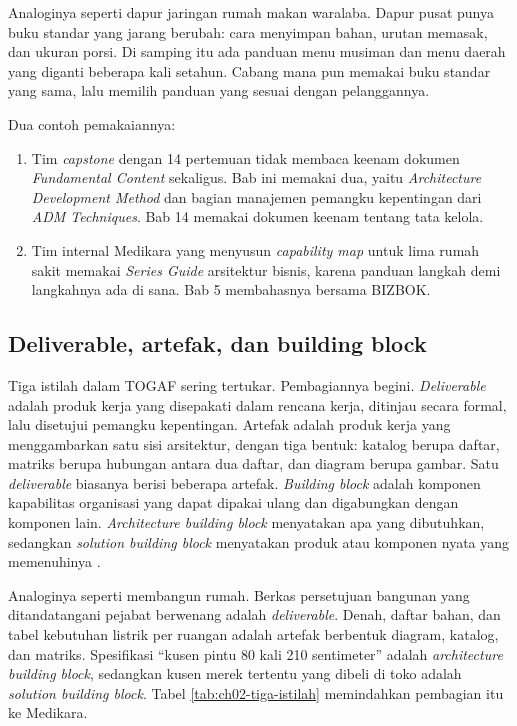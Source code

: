Analoginya seperti dapur jaringan rumah makan waralaba. Dapur pusat punya
buku standar yang jarang berubah: cara menyimpan bahan, urutan memasak, dan
ukuran porsi. Di samping itu ada panduan menu musiman dan menu daerah yang
diganti beberapa kali setahun. Cabang mana pun memakai buku standar yang
sama, lalu memilih panduan yang sesuai dengan pelanggannya.

Dua contoh pemakaiannya:

\begin{enumerate}
  \item Tim \textit{capstone} dengan 14 pertemuan tidak membaca keenam
        dokumen \textit{Fundamental Content} sekaligus. Bab ini memakai
        dua, yaitu \textit{Architecture Development Method} dan bagian
        manajemen pemangku kepentingan dari \textit{ADM Techniques}. Bab 14
        memakai dokumen keenam tentang tata kelola.
  \item Tim internal Medikara yang menyusun \textit{capability map} untuk
        lima rumah sakit memakai \textit{Series Guide} arsitektur bisnis,
        karena panduan langkah demi langkahnya ada di sana. Bab 5
        membahasnya bersama BIZBOK.
\end{enumerate}

\subsection*{Deliverable, artefak, dan building block}

Tiga istilah dalam TOGAF sering tertukar. Pembagiannya begini.
\textit{Deliverable} adalah produk kerja yang disepakati dalam rencana
kerja, ditinjau secara formal, lalu disetujui pemangku kepentingan.
Artefak adalah produk kerja yang menggambarkan satu sisi arsitektur, dengan
tiga bentuk: katalog berupa daftar, matriks berupa hubungan antara dua
daftar, dan diagram berupa gambar. Satu \textit{deliverable} biasanya berisi
beberapa artefak. \textit{Building block} adalah komponen kapabilitas
organisasi yang dapat dipakai ulang dan digabungkan dengan komponen lain.
\textit{Architecture building block} menyatakan apa yang dibutuhkan,
sedangkan \textit{solution building block} menyatakan produk atau komponen
nyata yang memenuhinya \cite{togaf10}.

Analoginya seperti membangun rumah. Berkas persetujuan bangunan yang
ditandatangani pejabat berwenang adalah \textit{deliverable}. Denah, daftar
bahan, dan tabel kebutuhan listrik per ruangan adalah artefak berbentuk
diagram, katalog, dan matriks. Spesifikasi ``kusen pintu 80 kali 210
sentimeter'' adalah \textit{architecture building block}, sedangkan kusen
merek tertentu yang dibeli di toko adalah \textit{solution building block}.
Tabel \ref{tab:ch02-tiga-istilah} memindahkan pembagian itu ke Medikara.

